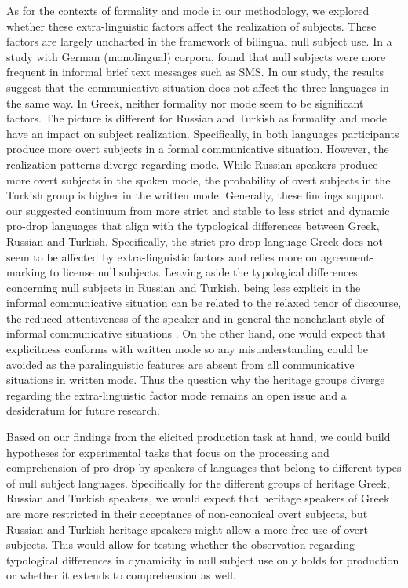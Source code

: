 \documentclass[output=paper,colorlinks,citecolor=brown]{langscibook}
\begin{document}
As for the contexts of formality and mode in our methodology, we explored whether these extra-linguistic factors affect the realization of subjects. These factors are largely uncharted in the framework of bilingual null subject use. In a study with German (monolingual) corpora, \textcite{Frick_2017} found that null subjects were more frequent in informal brief text messages such as SMS. In our study, the results suggest that the communicative situation does not affect the three languages in the same way. In Greek, neither formality nor mode seem to be significant factors. The picture is different for Russian and Turkish as formality and mode have an impact on subject realization. Specifically, in both languages participants produce more overt subjects in a formal communicative situation.
However, the realization patterns diverge regarding mode.
While Russian speakers produce more overt subjects in the spoken mode, the probability of overt subjects in the Turkish group is higher in the written mode. Generally, these findings support our suggested continuum from more strict and stable to less strict and dynamic pro-drop languages that align with the typological differences between Greek, Russian and Turkish. Specifically, the strict pro-drop language Greek does not seem to be affected by extra-linguistic factors and relies more on agreement-marking to license null subjects.
Leaving aside the typological differences concerning null subjects in Russian and Turkish, being less explicit in the informal communicative situation can be related to the relaxed tenor of discourse, the reduced attentiveness of the speaker and in general the nonchalant style of informal communicative situations \parencite{stowell2017introducing}. On the other hand, one would expect that explicitness conforms with written mode so any misunderstanding could be avoided as the paralinguistic features are absent from all communicative situations in written mode. Thus the question why the heritage groups diverge regarding the extra-linguistic factor mode remains an open issue and a desideratum for future research.

Based on our findings from the elicited production task at hand, we could build hypotheses for experimental tasks that focus on the processing and comprehension of pro-drop by speakers of languages that belong to different types of null subject languages. Specifically for the different groups of heritage Greek, Russian and Turkish speakers, we would expect that heritage speakers of Greek are more restricted in their acceptance of non-canonical overt subjects, but Russian and Turkish heritage speakers might allow a more free use of overt subjects. This would allow for testing whether the observation regarding typological differences in dynamicity in null subject use only holds for production or whether it extends to comprehension as well.
\end{document}
